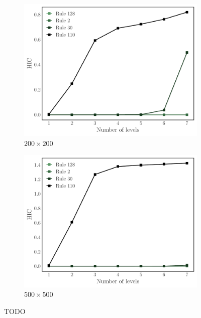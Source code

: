 \begin{figure}[ht]
\centering
\begin{subfigure}{0.45\textwidth}
  \includegraphics[width=1.0\textwidth]{figures/hic_vs_num_levels_size_200}
  \caption{$200 \times 200$}
\end{subfigure}
\begin{subfigure}{0.45\textwidth}
  \includegraphics[width=1.0\textwidth]{figures/hic_vs_num_levels_size_500}
  \caption{$500 \times 500$}
\end{subfigure}
\caption{TODO}
\label{fig:hic_vs_levels}
\end{figure}


